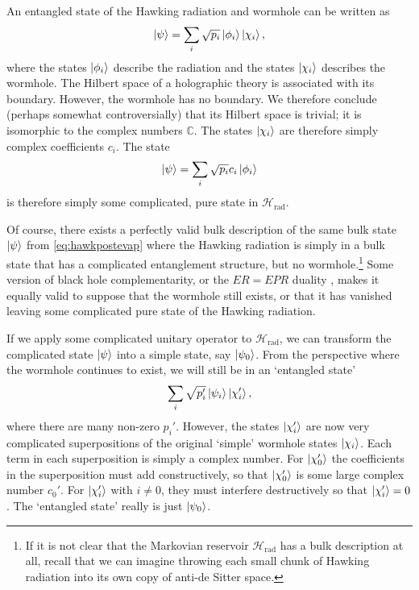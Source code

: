\documentclass[12pt]{article}
\begin{document}
An entangled state of the Hawking radiation and wormhole can be written as
\begin{align} \label{eq:hawkpostevapentangled}
\ket{\psi} = \sum_i \sqrt{p_i} \ket{\phi_i} \ket{\chi_i},
\end{align}
where the states $\ket{\phi_i}$ describe the radiation and the states $\ket{\chi_i}$ describes the wormhole. The Hilbert space of a holographic theory is associated with its boundary. However, the wormhole has no boundary. We therefore conclude (perhaps somewhat controversially) that its Hilbert space is trivial; it is isomorphic to the complex numbers $\mathbb{C}$. The states $\ket{\chi_i}$ are therefore simply complex coefficients $c_i$. The state
\begin{align} \label{eq:hawkpostevap}
\ket{\psi} = \sum_i \sqrt{p_i} c_i \ket{\phi_i}
\end{align}
is therefore simply some complicated, pure state in $\mathcal{H}_\text{rad}$.

Of course, there exists a perfectly valid bulk description of the same bulk state $\ket{\psi}$ from \eqref{eq:hawkpostevap} where the Hawking radiation is simply in a bulk state that has a complicated entanglement structure, but no wormhole.\footnote{If it is not clear that the Markovian reservoir $\mathcal{H}_\text{rad}$ has a bulk description at all, recall that we can imagine throwing each small chunk of Hawking radiation into its own copy of anti-de Sitter space.} Some version of black hole complementarity, or the $ER=EPR$ duality \cite{maldacena2013cool}, makes it equally valid to suppose that the wormhole still exists, or that it has vanished leaving some complicated pure state of the Hawking radiation.

If we apply some complicated unitary operator to $\mathcal{H}_\text{rad}$, we can transform the complicated state $\ket{\psi}$ into a simple state, say $\ket{\psi_0}$. From the perspective where the wormhole continues to exist, we will still be in an `entangled state'
\begin{align}
\sum_i \sqrt{p_i'} \ket{\psi_i} \ket{\chi_i'},
\end{align}
where there are many non-zero $p_i'$. However, the states $\ket{\chi_i'}$ are now very complicated superpositions of the original `simple' wormhole states $\ket{\chi_i}$. Each term in each superposition is simply a complex number. For $\ket{\chi'_0}$ the coefficients in the superposition must add constructively, so that $\ket{\chi'_0}$ is some large complex number $c_0'$. For $\ket{\chi'_i}$ with $i \neq 0$, they must interfere destructively so that $\ket{\chi'_i} = 0$. The `entangled state' really is just $\ket{\psi_0}$.
\end{document}
